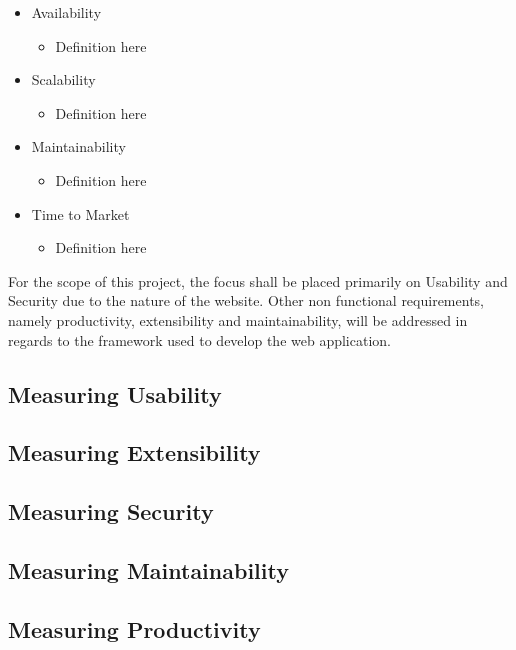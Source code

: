 \begin {itemize}

\item	Availability
\begin {itemize}
\item	Definition here
\end{itemize}

\item	Scalability
\begin {itemize}
\item	Definition here
\end{itemize}

\item	Maintainability
\begin {itemize}
\item	Definition here
\end{itemize}

\item	Time to Market
\begin {itemize}
\item	Definition here
\end{itemize}

\end{itemize}

For the scope of this project, the focus shall be placed primarily on Usability and Security due to the nature of the website. Other non functional requirements, namely productivity, extensibility and maintainability, will be addressed in regards to the framework used to develop the web application.


\subsection{Measuring Usability}

\subsection{Measuring Extensibility}

\subsection{Measuring Security}

\subsection{Measuring Maintainability}

\subsection{Measuring Productivity }

